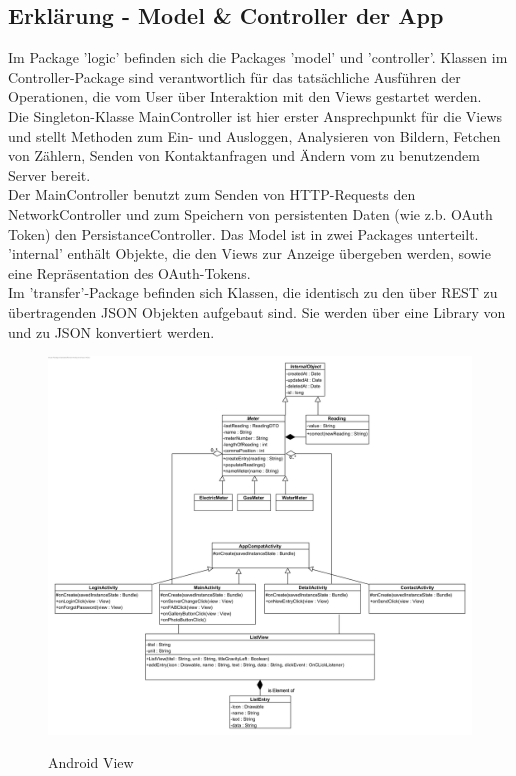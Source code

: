 \subsection*{Erklärung - Model \& Controller der App}
Im Package 'logic' befinden sich die Packages 'model' und 'controller'.
Klassen im Controller-Package sind verantwortlich für das tatsächliche Ausführen der Operationen, die vom User über Interaktion mit den Views gestartet werden. \\ Die Singleton-Klasse MainController ist hier erster Ansprechpunkt für die Views und stellt Methoden zum Ein- und Ausloggen, Analysieren von Bildern, Fetchen von Zählern, Senden von Kontaktanfragen und Ändern vom zu benutzendem Server bereit. \\ Der MainController benutzt zum Senden von HTTP-Requests den NetworkController und zum Speichern von persistenten Daten (wie z.b. OAuth Token) den PersistanceController.
Das Model ist in zwei Packages unterteilt. 'internal' enthält Objekte, die den Views zur Anzeige übergeben werden, sowie eine Repräsentation des OAuth-Tokens. \\ Im 'transfer'-Package befinden sich Klassen, die identisch zu den über REST zu übertragenden JSON Objekten aufgebaut sind. Sie werden über eine Library von und zu JSON konvertiert werden.

\begin{figure}[H]
\hspace{-1cm}
\includegraphics[scale=0.95]{img/diagrams/Android-Class-Diagram-View}\\
\caption{Android View}
\end{figure}


